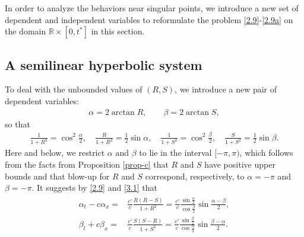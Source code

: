 \documentclass[11pt,reqno]{article}
\newcommand{\fr}{\frac}
\numberwithin{equation}{section}
\begin{document}
In order to analyze the behaviors near singular points, we introduce a new set of dependent and independent variables to reformulate
the problem \eqref{2.9}-\eqref{2.9a} on the domain $\mathbb{R}\times[0,t^*]$ in this section.



\subsection{A semilinear hyperbolic system}\label{S31}

To deal with the unbounded values of $(R, S)$, we introduce a new pair of dependent
variables:
\begin{align}\label{3.1}
\alpha=2\arctan R,\qquad \beta=2\arctan S,
\end{align}
so that
\begin{align}\label{3.2}
\fr{1}{1+R^2}=\cos^2\fr{\alpha}{2},\quad \fr{R}{1+R^2}=\fr{1}{2}\sin \alpha,\quad \fr{1}{1+S^2}=\cos^2\fr{\beta}{2},\quad \fr{S}{1+S^2}=\fr{1}{2}\sin \beta.
\end{align}
Here and below, we restrict $\alpha$ and $\beta$ to lie in the interval $[-\pi,\pi)$, which follows from the facts from Proposition \ref{prop-c} that $R$ and $S$ have positive upper bounds and that  blow-up for $R$ and $S$ correspond, respectively, to $\alpha=-\pi$ and $\beta=-\pi$.
It suggests by \eqref{2.9} and \eqref{3.1} that
\begin{align}\label{3.3}
\begin{split}
\alpha_t-c\alpha_x=&\fr{c'}{c}\fr{R(R-S)}{1+R^2}=\fr{c'}{c}\fr{\sin\fr{\alpha}{2}}{\cos\fr{\beta}{2}} \sin\fr{\alpha-\beta}{2},\\
\beta_t+c\beta_x=&\fr{c'}{c}\fr{S(S-R)}{1+S^2}=\fr{c'}{c}\fr{\sin\fr{\beta}{2}}{\cos\fr{\alpha}{2}} \sin\fr{\beta-\alpha}{2}.
\end{split}
\end{align}
\end{document}
